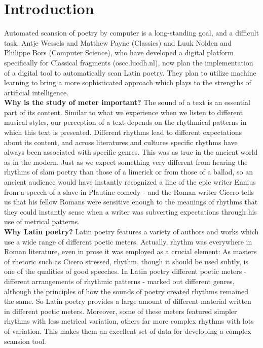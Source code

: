 \section{Introduction}
Automated scansion of poetry by computer is a long-standing goal, and a difficult task. Antje Wessels and Matthew Payne (Classics) and Luuk Nolden and Philippe Bors (Computer Science), who have developed a digital platform specifically for Classical fragments (oscc.lucdh.nl), now plan the implementation of a digital tool to automatically scan Latin poetry. They plan to utilize machine learning to bring a more sophisticated approach which plays to the strengths of artificial intelligence.\\

\textbf{Why is the study of meter important?}
The sound of a text is an essential part of its content. Similar to what we experience when we listen to different musical styles, our perception of a text depends on the rhythmical patterns in which this text is presented. Different rhythms lead to different expectations about its content, and across literatures and cultures specific rhythms have always been associated with specific genres. This was as true in the ancient world as in the modern. Just as we expect something very different from hearing the rhythms of slam poetry than those of a limerick or from those of a ballad, so an ancient audience would have instantly recognized a line of the epic writer Ennius from a speech of a slave in Plautine comedy - and the Roman writer Cicero tells us that his fellow Romans were sensitive enough to the meanings of rhythms that they could instantly sense when a writer was subverting expectations through his use of metrical patterns.\\

\textbf{Why Latin poetry?}
Latin poetry features a variety of authors and works which use a wide range of different poetic meters. Actually, rhythm was everywhere in Roman literature, even in prose it was employed as a crucial element: As masters of rhetoric such as Cicero stressed, rhythm, though it should be used subtly, is one of the qualities of good speeches. In Latin poetry different poetic meters - different arrangements of rhythmic patterns - marked out different genres, although the principles of how the sounds of poetry created rhythms remained the same. So Latin poetry provides a large amount of different material written in different poetic meters. Moreover, some of these meters featured simpler rhythms with less metrical variation, others far more complex rhythms with lots of variation. This makes them an excellent set of data for developing a complex scansion tool.\\

